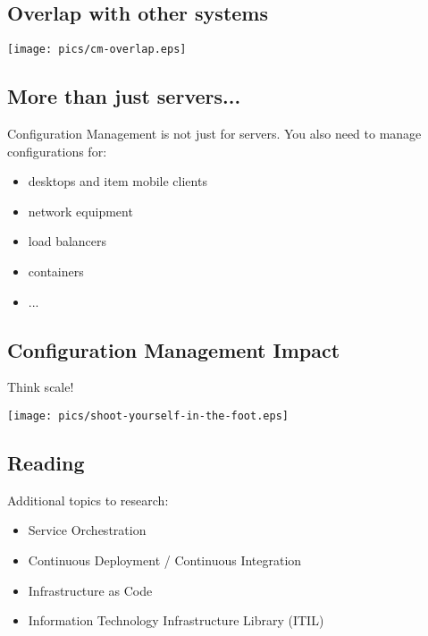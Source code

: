 \documentclass[xga]{xdvislides}
\begin{document}
\subsection{Overlap with other systems}
\vspace*{\fill}
\begin{center}
	\texttt{[image: pics/cm-overlap.eps]} \\
\end{center}
\vspace*{\fill}

\subsection{More than just servers...}
Configuration Management is not just for servers.  You
also need to manage configurations for:
\vspace{.25in}

\begin{itemize}
	\item desktops and item mobile clients
	\item network equipment
	\item load balancers
	\item containers
	\item ...
\end{itemize}

\subsection{Configuration Management Impact}
Think scale!

\begin{center}
	\texttt{[image: pics/shoot-yourself-in-the-foot.eps]} \\
\end{center}


\subsection{Reading}

Additional topics to research:
\begin{itemize}
	\item Service Orchestration
	\item Continuous Deployment / Continuous Integration
	\item Infrastructure as Code
	\item Information Technology Infrastructure Library (ITIL)
\end{itemize}
\vspace{.25in}
\end{document}
